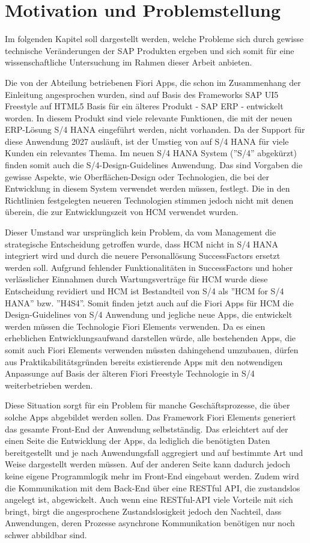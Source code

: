 \section{Motivation und Problemstellung}

Im folgenden Kapitel soll dargestellt werden, welche Probleme sich durch gewisse technische Veränderungen der SAP Produkten ergeben und sich somit für eine wissenschaftliche Untersuchung im Rahmen dieser Arbeit anbieten.

Die von der Abteilung betriebenen Fiori Apps, die schon im Zusammenhang der Einleitung angesprochen wurden, sind auf Basis des Frameworks SAP UI5 Freestyle auf HTML5 Basis für ein älteres Produkt - SAP ERP - entwickelt worden. In diesem Produkt sind viele relevante Funktionen, die mit der neuen ERP-Lösung S/4 HANA eingeführt werden, nicht vorhanden. Da der Support für diese Anwendung 2027 ausläuft, ist der Umstieg von auf S/4 HANA für viele Kunden ein relevantes Thema. Im neuen S/4 HANA System (''S/4'' abgekürzt) finden somit auch die S/4-Design-Guidelines Anwendung. Das sind Vorgaben die gewisse Aspekte, wie \zB Oberflächen-Design oder Technologien, die bei der Entwicklung in diesem System verwendet werden müssen, festlegt. Die in den Richtlinien festgelegten neueren Technologien stimmen jedoch nicht mit denen überein, die zur Entwicklungszeit von HCM verwendet wurden.

Dieser Umstand war ursprünglich kein Problem, da vom Management die strategische Entscheidung getroffen wurde, dass HCM nicht in S/4 HANA integriert wird und durch die neuere Personallösung SuccessFactors ersetzt werden soll. Aufgrund fehlender Funktionalitäten in SuccessFactors und  hoher verlässlicher Einnahmen durch Wartungsverträge für HCM wurde diese Entscheidung revidiert und HCM ist Bestandteil von S/4 als ''HCM for S/4 HANA'' bzw. ''H4S4''. Somit finden jetzt auch auf die Fiori Apps für HCM die Design-Guidelines von S/4 Anwendung und jegliche neue Apps, die entwickelt werden müssen die Technologie Fiori Elements verwenden. Da es einen erheblichen Entwicklungsaufwand darstellen würde, alle bestehenden Apps, die somit auch Fiori Elements verwenden müssten dahingehend umzubauen, dürfen aus Praktikabilitätsgründen bereits existierende Apps mit den notwendigen Anpassunge auf Basis der älteren Fiori Freestyle Technologie in S/4 weiterbetrieben werden.

Diese Situation sorgt für ein Problem für manche Geschäftsprozesse, die über solche Apps abgebildet werden sollen. Das Framework Fiori Elements generiert das gesamte Front-End der Anwendung selbstständig. Das erleichtert auf der einen Seite die Entwicklung der Apps, da lediglich die benötigten Daten bereitgestellt und je nach Anwendungsfall aggregiert und auf bestimmte Art und Weise dargestellt werden müssen. Auf der anderen Seite kann dadurch jedoch keine eigene Programmlogik mehr im Front-End eingebaut werden. Zudem wird die Kommunikation mit dem Back-End über eine RESTful API, die zustandslos angelegt ist, abgewickelt. Auch wenn eine RESTful-API viele Vorteile mit sich bringt, birgt die angesprochene Zustandslosigkeit jedoch den Nachteil, dass Anwendungen, deren Prozesse asynchrone Kommunikation benötigen nur noch schwer abbildbar sind.

